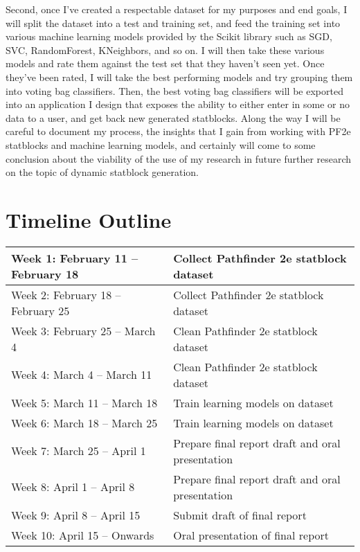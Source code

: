 \documentclass[11pt]{article}
\begin{document}
Second, once I've created a respectable dataset for my purposes and end goals, I will split the dataset into a test and training set, and feed the training set into various machine learning models provided by the Scikit library \cite{scikit2} such as SGD, SVC, RandomForest, KNeighbors, and so on. I will then take these various models and rate them against the test set that they haven't seen yet. Once they've been rated, I will take the best performing models and try grouping them into voting bag classifiers. Then, the best voting bag classifiers will be exported into an application I design that exposes the ability to either enter in some or no data to a user, and get back new generated statblocks. Along the way I will be careful to document my process, the insights that I gain from working with PF2e statblocks and machine learning models, and certainly will come to some conclusion about the viability of the use of my research in future further research on the topic of dynamic statblock generation. 

\section{Timeline Outline}

\begin{center}
  \begin{tabular}{| l | l |}
    \hline
    Week 1: February 11 -- February 18 & Collect Pathfinder 2e statblock dataset \\
    \hline
    Week 2: February 18 -- February 25 & Collect Pathfinder 2e statblock dataset \\
    \hline
    Week 3: February 25 -- March 4 & Clean Pathfinder 2e statblock dataset \\
    \hline
    Week 4: March 4 -- March 11 & Clean Pathfinder 2e statblock dataset \\
    \hline
    Week 5: March 11 -- March 18 & Train learning models on dataset \\
    \hline
    Week 6: March 18 -- March 25 & Train learning models on dataset \\
    \hline
    Week 7: March 25 -- April 1 & Prepare final report draft and oral presentation \\
    \hline
    Week 8: April 1 -- April 8 & Prepare final report draft and oral presentation \\
    \hline
    Week 9: April 8 -- April 15 & Submit draft of final report \\
    \hline
    Week 10: April 15 -- Onwards & Oral presentation of final report \\
    \hline
  \end{tabular}
\end{center}

\printbibliography
\end{document}
